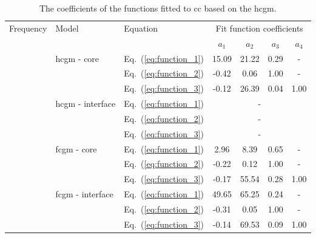 \begin{table}
	\small
	\tabcolsep=0.2cm
	\centering
	\caption{\label{tab:fit_hcgm_CC}The coefficients of the functions fitted to \acf{cc} based on the \acf{hcgm}.}
	\begin{tabular}{cllcccc}
		\toprule
		\multirow{2}{*}{Frequency} & \multirow{2}{*}{Model} & Equation & \multicolumn{4}{c}{Fit function coefficients}\\
		& & & \(a_1\) & \(a_2\) & \(a_3\) & \(a_4\)\\
		\midrule
		\multirow{6}{*}{\rotatebox[origin=c]{90}{50 \unit{\kHz}}} & \multirow{3}{*}{\ac{hcgm} - core} & Eq.~(\ref{eq:function_1}) & 15.09 & 21.22 & 0.29 &-\\
		& & Eq.~(\ref{eq:function_2}) & -0.42 & 0.06 & 1.00 &- \\
		& & Eq.~(\ref{eq:function_3}) & -0.12 & 26.39 & 0.04 & 1.00 \\
		\cline{2-7}
		& \multirow{3}{*}{\ac{hcgm} - interface} & Eq.~(\ref{eq:function_1}) & \multicolumn{4}{c}{-}\\
		& & Eq.~(\ref{eq:function_2}) & \multicolumn{4}{c}{-}\\
		& & Eq.~(\ref{eq:function_3}) & \multicolumn{4}{c}{-}\\
		\midrule
		\multirow{6}{*}{\rotatebox[origin=c]{90}{100 \unit{\kHz}}} & \multirow{3}{*}{\ac{fcgm} - core} & Eq.~(\ref{eq:function_1}) & 2.96 & 8.39 & 0.65 &-\\
		& & Eq.~(\ref{eq:function_2}) & -0.22 & 0.12 & 1.00 &- \\
		& & Eq.~(\ref{eq:function_3}) & -0.17 & 55.54 & 0.28 & 1.00\\
		\cline{2-7}
		& \multirow{3}{*}{\ac{fcgm} - interface} & Eq.~(\ref{eq:function_1}) & 49.65 & 65.25 & 0.24 &-\\
		& & Eq.~(\ref{eq:function_2}) & -0.31 & 0.05 & 1.00 &- \\
		& & Eq.~(\ref{eq:function_3}) & -0.14 & 69.53 & 0.09 & 1.00\\
		\bottomrule
	\end{tabular}
\end{table}

